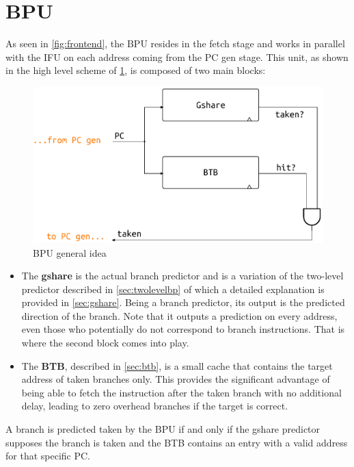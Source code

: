 \section{\acf{BPU}}
As seen in \cref{fig:frontend}, the \ac{BPU} resides in the fetch stage and works in parallel with the \ac{IFU} on each address coming from the \ac{PC} gen stage. This unit, as shown in the high level scheme of \cref{fig:bpu-idea}, is composed of two main blocks:
\begin{figure}[hbt]
  \centering
  \includegraphics[width=.8\textwidth]{img/bpu-idea.pdf}
  \caption{\acs{BPU} general idea}
  \label{fig:bpu-idea}
\end{figure}
\begin{itemize}
  \item The \textbf{gshare} is the actual branch predictor and is a variation of the two-level predictor described in \cref{sec:twolevelbp} of which a detailed explanation is provided in \cref{sec:gshare}. Being a branch predictor, its output is the predicted direction of the branch. Note that it outputs a prediction on every address, even those who potentially do not correspond to branch instructions. That is where the second block comes into play.
  \item The \textbf{\acf{BTB}}, described in \cref{sec:btb}, is a small cache that contains the target address of taken branches only. This provides the significant advantage of being able to fetch the instruction after the taken branch with no additional delay, leading to zero overhead branches if the target is correct.
\end{itemize}
A branch is predicted taken by the \ac{BPU} if and only if the gshare predictor supposes the branch is taken and the \ac{BTB} contains an entry with a valid address for that specific \ac{PC}.

